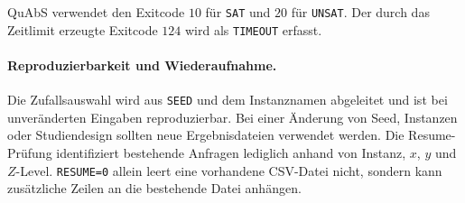 QuAbS verwendet den Exitcode \(10\) für \texttt{SAT} und \(20\) für
\texttt{UNSAT}. Der durch das Zeitlimit erzeugte Exitcode \(124\) wird
als \texttt{TIMEOUT} erfasst.

\paragraph{Reproduzierbarkeit und Wiederaufnahme.}
Die Zufallsauswahl wird aus \texttt{SEED} und dem Instanznamen
abgeleitet und ist bei unveränderten Eingaben reproduzierbar. Bei einer
Änderung von Seed, Instanzen oder Studiendesign sollten neue
Ergebnisdateien verwendet werden. Die Resume-Prüfung identifiziert
bestehende Anfragen lediglich anhand von Instanz, \(x\), \(y\) und
\(Z\)-Level. \texttt{RESUME=0} allein leert eine vorhandene CSV-Datei
nicht, sondern kann zusätzliche Zeilen an die bestehende Datei
anhängen.
